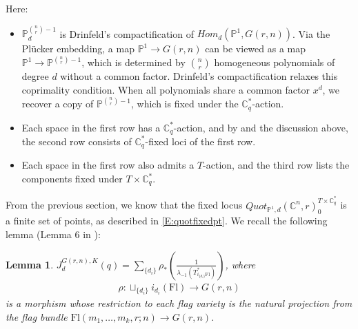 \documentclass{amsart}
\newtheorem{lemma}[thm]{Lemma}
\begin{document}
\begin{center}
\end{center}  
Here:
\begin{itemize}
\item $\mathbb{P}_d^{\binom{n}{r}-1}$ is Drinfeld's compactification of $Hom_d(\mathbb{P}^1,G(r,n))$. Via the Plücker embedding, a map $\mathbb{P}^1 \to G(r,n)$ can be viewed as a map $\mathbb{P}^1 \to \mathbb{P}^{\binom{n}{r}-1}$, which is determined by $\binom{n}{r}$ homogeneous polynomials of degree $d$ without a common factor. Drinfeld's compactification relaxes this coprimality condition. When all polynomials share a common factor $x^d$, we recover a copy of $\mathbb{P}^{\binom{n}{r}-1}$, which is fixed under the $\mathbb{C}_q^*$-action.
\item Each space in the first row has a $\mathbb{C}_q^*$-action, and by  and the discussion above, the second row consists of $\mathbb{C}_q^*$-fixed loci of the first row.
\item Each space in the first row also admits a $T$-action, and the third row lists the components fixed under $T \times \mathbb{C}_q^*$.
\end{itemize}
From the previous section, we know that the fixed locus $Quot_{\mathbb{P}^1,d}(\mathbb{C}^n,r)_{0}^{T \times \mathbb{C}_q^*}$ is a finite set of points, as described in \eqref{E:quotfixedpt}.
We recall the following lemma (Lemma 6 in \cite{Taipale}):
\begin{lemma} \label{function-defined}
    $J_d^{G(r,n),K}(q) = \sum_{\{d_i\}}\rho_*\left(\frac{1}{\lambda_{-1}(T^*_{i_{\{d_i\}} \mathrm{Fl}})}\right)$,
    where 
    \begin{align}\label{map:rho}
        \rho:  \sqcup_{\{d_i\}} i_{d_i}(\mathrm{Fl}) \to G(r,n)
    \end{align}
     is a morphism whose restriction to each flag variety is the natural projection from the flag bundle $\mathrm{Fl}(m_1,\dots,m_k,r;n) \to G(r,n)$. 
\end{lemma}
\end{document}
